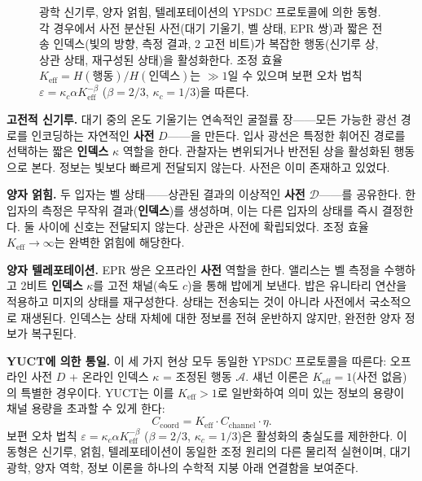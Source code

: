 \documentclass[12pt,a4paper]{article}
\begin{document}
\begin{figure}[htbp]
{%
		}
		\caption{광학 신기루, 양자 얽힘, 텔레포테이션의 YPSDC 프로토콜에 의한 동형. 각 경우에서 사전 분산된 사전(대기 기울기, 벨 상태, EPR 쌍)과 짧은 전송 인덱스(빛의 방향, 측정 결과, 2 고전 비트)가 복잡한 행동(신기루 상, 상관 상태, 재구성된 상태)을 활성화한다. 조정 효율 $K_{\mathrm{eff}} = H(\text{행동})/H(\text{인덱스})$는 $\gg 1$일 수 있으며 보편 오차 법칙 $\varepsilon = \kappa_c \alpha K_{\mathrm{eff}}^{-\beta}$ ($\beta=2/3$, $\kappa_c=1/3$)을 따른다.}
		\label{fig:mirage-ypsdc}
	\end{figure}
	
	\textbf{고전적 신기루.}
	대기 중의 온도 기울기는 연속적인 굴절률 장——모든 가능한 광선 경로를 인코딩하는 자연적인 \textbf{사전} $D$——을 만든다. 입사 광선은 특정한 휘어진 경로를 선택하는 짧은 \textbf{인덱스} $\kappa$ 역할을 한다. 관찰자는 변위되거나 반전된 상을 활성화된 행동으로 본다. 정보는 빛보다 빠르게 전달되지 않는다. 사전은 이미 존재하고 있었다.
	
	\textbf{양자 얽힘.}
	두 입자는 벨 상태——상관된 결과의 이상적인 \textbf{사전} $\mathcal{D}$——를 공유한다. 한 입자의 측정은 무작위 결과(\textbf{인덱스})를 생성하며, 이는 다른 입자의 상태를 즉시 결정한다. 둘 사이에 신호는 전달되지 않는다. 상관은 사전에 확립되었다. 조정 효율 $K_{\mathrm{eff}} \to \infty$는 완벽한 얽힘에 해당한다.
	
	\textbf{양자 텔레포테이션.}
	EPR 쌍은 오프라인 \textbf{사전} 역할을 한다. 앨리스는 벨 측정을 수행하고 2비트 \textbf{인덱스} $\kappa$를 고전 채널(속도 $c$)을 통해 밥에게 보낸다. 밥은 유니타리 연산을 적용하고 미지의 상태를 재구성한다. 상태는 전송되는 것이 아니라 사전에서 국소적으로 재생된다. 인덱스는 상태 자체에 대한 정보를 전혀 운반하지 않지만, 완전한 양자 정보가 복구된다.
	
	\textbf{YUCT에 의한 통일.}
	이 세 가지 현상 모두 동일한 YPSDC 프로토콜을 따른다: 오프라인 사전 $D$ + 온라인 인덱스 $\kappa$ = 조정된 행동 $\mathcal{A}$. 섀넌 이론은 $K_{\mathrm{eff}}=1$(사전 없음)의 특별한 경우이다. YUCT는 이를 $K_{\mathrm{eff}}>1$로 일반화하여 의미 있는 정보의 용량이 채널 용량을 초과할 수 있게 한다:
	\[
	C_{\mathrm{coord}} = K_{\mathrm{eff}} \cdot C_{\mathrm{channel}} \cdot \eta.
	\]
	보편 오차 법칙 $\varepsilon = \kappa_c \alpha K_{\mathrm{eff}}^{-\beta}$ ($\beta=2/3$, $\kappa_c=1/3$)은 활성화의 충실도를 제한한다. 이 동형은 신기루, 얽힘, 텔레포테이션이 동일한 조정 원리의 다른 물리적 실현이며, 대기 광학, 양자 역학, 정보 이론을 하나의 수학적 지붕 아래 연결함을 보여준다.
	
\end{document}
